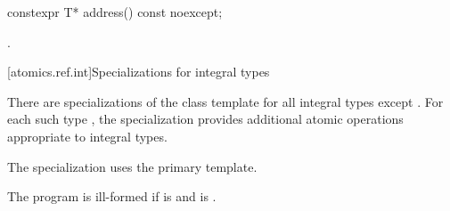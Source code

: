 %
\begin{itemdecl}
constexpr T* address() const noexcept;
\end{itemdecl}

\begin{itemdescr}
\pnum
\returns
{}.
\end{itemdescr}

[atomics.ref.int]{Specializations for integral types}

\pnum
{}%
There are specializations of the  class template
for all integral types except \cv{} .
For each such type ,
the specialization  provides
additional atomic operations appropriate to integral types.
\begin{note}
The specialization 
uses the primary template.
\end{note}

\pnum
The program is ill-formed
if  is  and
 is .

